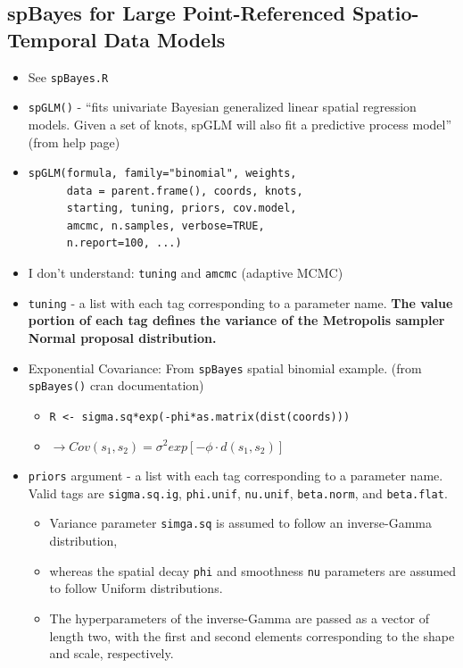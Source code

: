 \documentclass{article}
\begin{document}
\subsection*{spBayes for Large Point-Referenced Spatio-Temporal Data Models}
\begin{itemize}
\item See \verb|spBayes.R|
\item \verb|spGLM()| - ``fits univariate Bayesian generalized linear spatial regression models. Given a set of knots, spGLM will also fit a predictive process model'' (from help page) 
\item \begin{verbatim}
spGLM(formula, family="binomial", weights, 
      data = parent.frame(), coords, knots, 
      starting, tuning, priors, cov.model,
      amcmc, n.samples, verbose=TRUE,
      n.report=100, ...)
      \end{verbatim}
\item I don't understand: \verb|tuning| and \verb|amcmc| (adaptive MCMC) 
\item \verb|tuning| - a list with each tag corresponding to a parameter name. {\bf The value portion of each tag defines the variance of the Metropolis sampler Normal proposal distribution.} 
\item Exponential Covariance: From \verb|spBayes| spatial binomial example. (from \verb|spBayes()| cran documentation)
      \begin{itemize}
      \item \verb|R <- sigma.sq*exp(-phi*as.matrix(dist(coords)))|
      \item $\rightarrow Cov(s_{1}, s_{2}) = \sigma^{2}exp[-\phi \cdot d(s_{1},s_{2})]$
      \end{itemize}
\item \verb|priors| argument - a list with each tag corresponding to a parameter name. Valid tags are \verb|sigma.sq.ig|, \verb|phi.unif|, \verb|nu.unif|, \verb|beta.norm|, and \verb|beta.flat|. 
        \begin{itemize}
        \item Variance parameter \verb|simga.sq| is assumed to follow an inverse-Gamma distribution, 
        \item whereas the spatial decay \verb|phi| and smoothness \verb|nu| parameters are assumed to follow Uniform distributions. 
        \item The hyperparameters of the inverse-Gamma are passed as a vector of length two, with the first and second elements corresponding to the shape and scale, respectively. 

\end{itemize}
\end{itemize}
\end{document}
